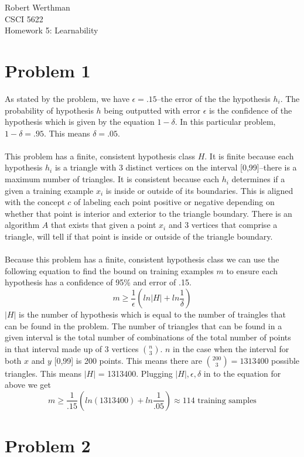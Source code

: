 \documentclass[12pt]{article}
\begin{document}
\noindent
Robert Werthman\\
CSCI 5622\\
Homework 5: Learnability\\

\section*{Problem 1}
As stated by the problem, we have $\epsilon = .15$--the error of the the hypothesis $h_i$.  The probability of hypothesis $h$ being outputted with error $\epsilon$ is the confidence of the hypothesis which is given by the equation $1 - \delta$.  In this particular problem, $1 - \delta = .95$.  This means $\delta = .05$.\\
\\
This problem has a finite, consistent hypothesis class $H$.  It is finite because each hypothesis $h_i$ is a triangle with 3 distinct vertices on the interval [0,99]--there is a maximum number of triangles.  It is consistent because each $h_i$ determines if a given a training example $x_i$ is inside or outside of its boundaries.  This is aligned with the concept $c$ of labeling each point positive or negative depending on whether that point is interior and exterior to the triangle boundary.  There is an algorithm $A$ that exists that given a point $x_i$ and 3 vertices that comprise a triangle, will tell if that point is inside or outside of the triangle boundary.\\
\\
Because this problem has a finite, consistent hypothesis class we can use the following equation to find the bound on training examples $m$ to ensure each hypothesis has a confidence of 95\% and error of .15.
\[
m \ge \frac{1}{\epsilon}(ln|H| + ln\frac{1}{\delta})
\]  
$|H|$ is the number of hypothesis which is equal to the number of traingles that can be found in the problem.  The number of triangles that can be found in a given interval is the total number of combinations of the total number of points in that interval made up of 3 vertices $\binom{n}{3}$.  $n$ in the case when the interval for both $x$ and $y$ [0,99] is 200 points.  This means there are $\binom{200}{3} = 1313400$ possible triangles.  This means $|H|$ = 1313400.  Plugging $|H|, \epsilon, \delta$ in to the equation for above we get
\[
m \ge \frac{1}{.15}(ln(1313400) + ln\frac{1}{.05}) \approx 114 \text{ training samples}
\]

\section*{Problem 2}
\end{document}
